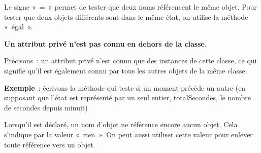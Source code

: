 \begin{liste}
		\item 
			Le signe «~=~» permet de tester que deux noms référencent le même objet.
			Pour tester que deux objets différents sont dans le même état, on
			utilise la méthode «~égal~».
			\\
			\bigskip
	\end{liste}
	
	\bigskip
	
	\begin{liste}
		\item {
			\textbf{Un attribut privé n'est pas connu en dehors de la
			classe.}
			
			Précisons~: un attribut privé n'est connu que
			des instances de cette classe, ce qui signifie qu'il
			est également connu par tous les autres objets de la même
			classe.
			
			\smallskip
			\textbf{Exemple}~: 	
			écrivons la méthode qui teste si un moment précède un
			autre (en supposant que l'état est représenté par un
			seul entier, totalSecondes, le nombre de secondes depuis minuit)
			
			\bigskip
			\bigskip
			}
		\item {
			Lorsqu'il est déclaré, un nom d'objet
			ne référence encore aucun objet. Cela s'indique par la
			valeur «~rien~». On peut aussi utiliser cette valeur pour enlever toute
			référence vers un objet.
			\\
			\bigskip
			}
	\end{liste}
	
